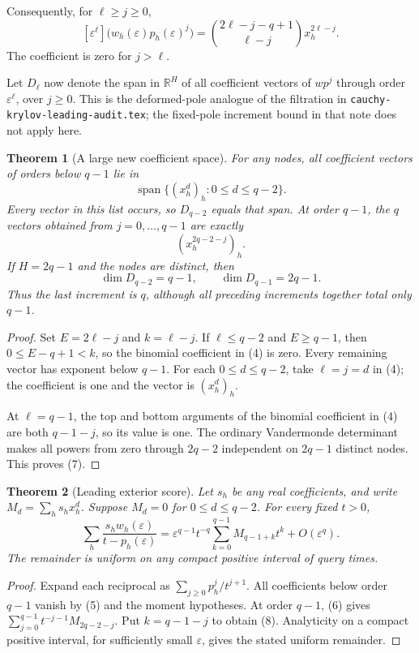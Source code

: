 \documentclass[11pt]{article}
\newtheorem{theorem}{Theorem}
\begin{document}
Consequently, for $\ell\geq j\geq0$,
\[
 [\varepsilon^\ell]\bigl(w_h(\varepsilon)
                         p_h(\varepsilon)^j\bigr)
 =\binom{2\ell-j-q+1}{\ell-j}x_h^{2\ell-j}.
 \tag{4}
\]
The coefficient is zero for $j>\ell$.

Let $D_\ell$ now denote the span in $\mathbb R^H$ of all coefficient
vectors of $w p^j$ through order $\varepsilon^\ell$, over $j\geq0$.
This is the deformed-pole analogue of the filtration in
\texttt{cauchy-krylov-leading-audit.tex}; the fixed-pole increment
bound in that note does not apply here.

\begin{theorem}[A large new coefficient space]
For any nodes, all coefficient vectors of orders below $q-1$ lie in
\[
 \operatorname{span}\{(x_h^d)_h:0\leq d\leq q-2\}.
 \tag{5}
\]
Every vector in this list occurs, so $D_{q-2}$ equals that span.
At order $q-1$, the $q$ vectors obtained from $j=0,\ldots,q-1$
are exactly
\[
 (x_h^{2q-2-j})_h.
 \tag{6}
\]
If $H=2q-1$ and the nodes are distinct, then
\[
 \dim D_{q-2}=q-1,\qquad \dim D_{q-1}=2q-1.
 \tag{7}
\]
Thus the last increment is $q$, although all preceding increments
together total only $q-1$.
\end{theorem}
\begin{proof}
Set $E=2\ell-j$ and $k=\ell-j$. If $\ell\leq q-2$ and
$E\geq q-1$, then $0\leq E-q+1<k$, so the binomial coefficient
in (4) is zero. Every remaining vector has exponent below $q-1$.
For each $0\leq d\leq q-2$, take $\ell=j=d$ in (4); the coefficient
is one and the vector is $(x_h^d)_h$.

At $\ell=q-1$, the top and bottom arguments of the binomial
coefficient in (4) are both $q-1-j$, so its value is one. The
ordinary Vandermonde determinant makes all powers from zero through
$2q-2$ independent on $2q-1$ distinct nodes. This proves (7).
\end{proof}

\begin{theorem}[Leading exterior score]
Let $s_h$ be any real coefficients, and write
$M_d=\sum_h s_h x_h^d$. Suppose $M_d=0$ for $0\leq d\leq q-2$.
For every fixed $t>0$,
\[
 \sum_h\frac{s_h w_h(\varepsilon)}{t-p_h(\varepsilon)}
 =\varepsilon^{q-1}t^{-q}
       \sum_{k=0}^{q-1}M_{q-1+k}t^k+O(\varepsilon^q).
 \tag{8}
\]
The remainder is uniform on any compact positive interval of query
times.
\end{theorem}
\begin{proof}
Expand each reciprocal as $\sum_{j\geq0}p_h^j/t^{j+1}$.
All coefficients below order $q-1$ vanish by (5) and the moment
hypotheses. At order $q-1$, (6) gives
$\sum_{j=0}^{q-1}t^{-j-1}M_{2q-2-j}$.
Put $k=q-1-j$ to obtain (8). Analyticity on a compact positive
interval, for sufficiently small $\varepsilon$, gives the stated
uniform remainder.
\end{proof}
\end{document}

